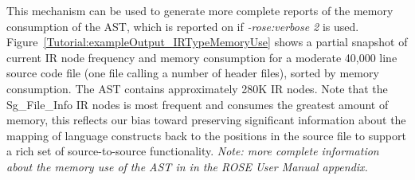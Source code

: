    This mechanism can be used to generate more complete reports of the memory consumption
of the AST, which is reported on if {\em -rose:verbose 2} is used.
Figure~\ref{Tutorial:exampleOutput_IRTypeMemoryUse}
shows a partial snapshot of current IR node frequency and memory consumption for
a moderate 40,000 line source code file (one file calling a number of header files),
sorted by memory consumption.  The AST contains approximately 280K IR nodes.
Note that the Sg\_File\_Info IR nodes is most frequent and consumes the greatest amount 
of memory, this reflects our bias toward preserving significant information about the
mapping of language constructs back to the positions in the source file to support
a rich set of source-to-source functionality.
{\em Note: more complete information about the memory use of the AST in in the ROSE User Manual appendix.}

